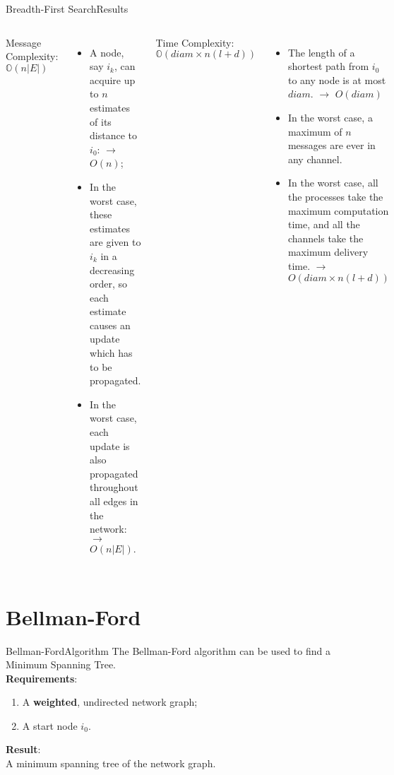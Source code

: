 \documentclass[pdf]{beamer}
\begin{document}
\begin{frame}{Breadth-First Search}{Results}
    \begin{columns}
            Message Complexity: \\
            \hspace*{\parindent} $\mathbb{O}(n|E|)$ \\
            \pause
            \small
            \begin{itemize}
                \item A node, say $i_k$, can acquire up to $n$ estimates of its distance to $i_0$: $\to$ $O(n)$;
                \item In the worst case, these estimates are given to $i_k$ in a decreasing order, so each estimate causes an update which has to be propagated.
                \item In the worst case, each update is also propagated throughout all edges in the network: $\to$ $O(n|E|)$.
            \end{itemize}
        \pause
            \normalsize
            Time Complexity:
            \hspace*{\parindent} $\mathbb{O}(diam \times n(l + d))$ \\
            \pause
            \small
            \begin{itemize}
                \item The length of a shortest path from $i_0$ to any node is at most $diam$. $\to$ $O(diam)$
                \item In the worst case, a maximum of $n$ messages are ever in any channel.
                \item In the worst case, all the processes take the maximum computation time, and all the channels take the maximum delivery time. $\to$ $O(diam \times n(l +d))$\\ 
            \end{itemize}           
    \end{columns} 
\end{frame}

\section{Bellman-Ford}
\begin{frame}{Bellman-Ford}{Algorithm}
    \normalsize
	The Bellman-Ford algorithm can be used to find a Minimum Spanning Tree. \\
    \vspace{12pt}
    \pause
    \textbf{Requirements}:
    \begin{enumerate}
        \item A \textbf{weighted}, undirected network graph;
        \item A start node $i_0$. 
    \end{enumerate}
    \pause
    \vspace{12pt}
    \textbf{Result}: \\
    A minimum spanning tree of the network graph.
\end{frame}
\end{document}

